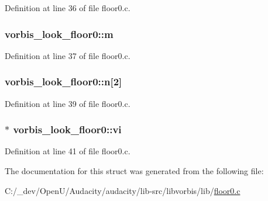 Definition at line 36 of file floor0.\+c.

\subsubsection[{\texorpdfstring{m}{m}}]{ vorbis\+\_\+look\+\_\+floor0\+::m}\hypertarget{structvorbis__look__floor0_a2c97e5e8bd8f4e1e8ad0e75e76f614a2}{}\label{structvorbis__look__floor0_a2c97e5e8bd8f4e1e8ad0e75e76f614a2}


Definition at line 37 of file floor0.\+c.

\subsubsection[{\texorpdfstring{n}{n}}]{ vorbis\+\_\+look\+\_\+floor0\+::n\mbox{[}2\mbox{]}}\hypertarget{structvorbis__look__floor0_ad90f6b0d5838dd0cb8a17fa976611c94}{}\label{structvorbis__look__floor0_ad90f6b0d5838dd0cb8a17fa976611c94}


Definition at line 39 of file floor0.\+c.

\subsubsection[{\texorpdfstring{vi}{vi}}]{$\ast$ vorbis\+\_\+look\+\_\+floor0\+::vi}\hypertarget{structvorbis__look__floor0_ab48f65e22b5580857a356ea5bc95a971}{}\label{structvorbis__look__floor0_ab48f65e22b5580857a356ea5bc95a971}


Definition at line 41 of file floor0.\+c.



The documentation for this struct was generated from the following file\+:\begin{DoxyCompactItemize}
\item 
C\+:/\+\_\+dev/\+Open\+U/\+Audacity/audacity/lib-\/src/libvorbis/lib/\hyperlink{floor0_8c}{floor0.\+c}\end{DoxyCompactItemize}

